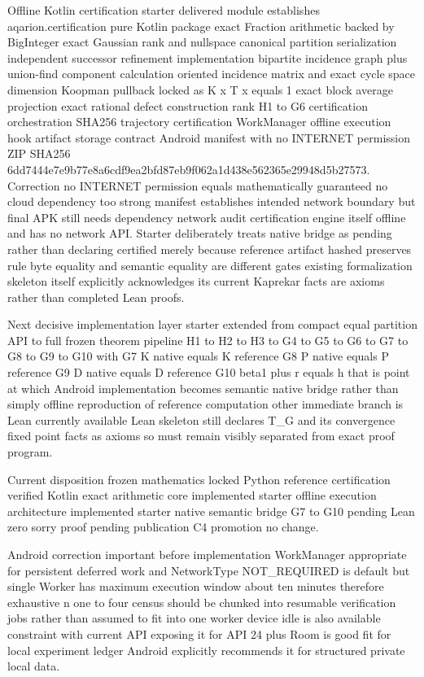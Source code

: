 Offline Kotlin certification starter delivered module establishes aqarion.certification pure Kotlin package exact Fraction arithmetic backed by BigInteger exact Gaussian rank and nullspace canonical partition serialization independent successor refinement implementation bipartite incidence graph plus union-find component calculation oriented incidence matrix and exact cycle space dimension Koopman pullback locked as K x T x equals 1 exact block average projection exact rational defect construction rank H1 to G6 certification orchestration SHA256 trajectory certification WorkManager offline execution hook artifact storage contract Android manifest with no INTERNET permission ZIP SHA256 6dd7444e7e9b77e8a6cdf9ea2bfd87eb9f062a1d438e562365e29948d5b27573. Correction no INTERNET permission equals mathematically guaranteed no cloud dependency too strong manifest establishes intended network boundary but final APK still needs dependency network audit certification engine itself offline and has no network API. Starter deliberately treats native bridge as pending rather than declaring certified merely because reference artifact hashed preserves rule byte equality and semantic equality are different gates existing formalization skeleton itself explicitly acknowledges its current Kaprekar facts are axioms rather than completed Lean proofs.

Next decisive implementation layer starter extended from compact equal partition API to full frozen theorem pipeline H1 to H2 to H3 to G4 to G5 to G6 to G7 to G8 to G9 to G10 with G7 K native equals K reference G8 P native equals P reference G9 D native equals D reference G10 beta1 plus r equals h that is point at which Android implementation becomes semantic native bridge rather than simply offline reproduction of reference computation other immediate branch is Lean currently available Lean skeleton still declares T_G and its convergence fixed point facts as axioms so must remain visibly separated from exact proof program.

Current disposition frozen mathematics locked Python reference certification verified Kotlin exact arithmetic core implemented starter offline execution architecture implemented starter native semantic bridge G7 to G10 pending Lean zero sorry proof pending publication C4 promotion no change.

Android correction important before implementation WorkManager appropriate for persistent deferred work and NetworkType NOT_REQUIRED is default but single Worker has maximum execution window about ten minutes therefore exhaustive n one to four census should be chunked into resumable verification jobs rather than assumed to fit into one worker device idle is also available constraint with current API exposing it for API 24 plus Room is good fit for local experiment ledger Android explicitly recommends it for structured private local data.

